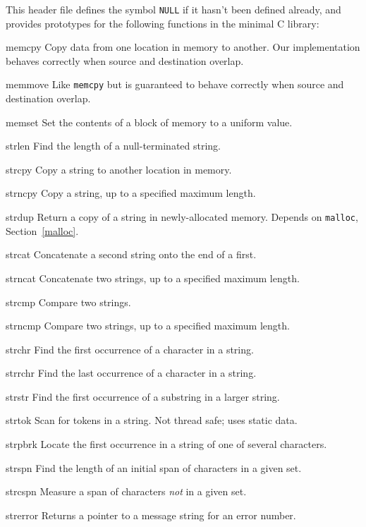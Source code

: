 \label{string-h}
\begin{apidesc}
	This header file defines the symbol {\tt NULL}
	if it hasn't been defined already,
	and provides prototypes
	for the following functions in the minimal C library:
	\begin{icsymlist}
	\item[memcpy]
		\label{memcpy}
		Copy data from one location in memory to another.
		Our implementation behaves correctly
		when source and destination overlap.
	\item[memmove]
		Like \texttt{memcpy} but is guaranteed to behave correctly
		when source and destination overlap.
	\item[memset]
		\label{memset}
		Set the contents of a block of memory to a uniform value.

	\item[strlen]
		\label{strlen}
		Find the length of a null-terminated string.
	\item[strcpy]
		Copy a string to another location in memory.
	\item[strncpy]
		Copy a string, up to a specified maximum length.
	\item[strdup]
		Return a copy of a string in newly-allocated memory.
		Depends on {\tt malloc}, Section~\ref{malloc}.
	\item[strcat]
		Concatenate a second string onto the end of a first.
	\item[strncat]
		Concatenate two strings, up to a specified maximum length.
	\item[strcmp]
		\label{strcmp}
		Compare two strings.
	\item[strncmp]
		Compare two strings, up to a specified maximum length.

	\item[strchr]
		Find the first occurrence of a character in a string.
	\item[strrchr]
		Find the last occurrence of a character in a string.
	\item[strstr]
		Find the first occurrence of a substring in a larger string.
	\item[strtok]
		\label{strtok}
		Scan for tokens in a string.
		Not thread safe; uses static data.
	\item[strpbrk]
		Locate the first occurrence in a string
		of one of several characters.
	\item[strspn]
		Find the length of an initial span of characters in a given set.
	\item[strcspn]
		Measure a span of characters \emph{not} in a given set.
	\item[strerror]
		Returns a pointer to a message string for an error number.
	\end{icsymlist}


\end{apidesc}
